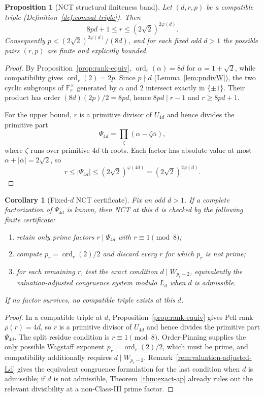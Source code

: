 \documentclass[11pt]{amsart}
\theoremstyle{plain}
\newtheorem{proposition}[theorem]{Proposition}
\newtheorem{corollary}[theorem]{Corollary}
\theoremstyle{definition}
\theoremstyle{remark}
\numberwithin{equation}{section}
\newcommand{\ord}{\operatorname{ord}}
\newcommand{\F}{\mathbb{F}}
\begin{document}
\begin{proposition}[NCT structural finiteness band]\label{prop:nct-band}
Let $(d, r, p)$ be a compatible triple (Definition~\ref{def:compat-triple}). Then
\[
  8 p d + 1 \leq r \leq (2\sqrt 2)^{2\varphi(d)}.
\]
Consequently $p < (2\sqrt 2)^{2\varphi(d)}/(8d)$, and for each fixed odd $d>1$ the possible pairs $(r,p)$ are finite and explicitly bounded.
\end{proposition}

\begin{proof}
By Proposition~\ref{prop:rank-equiv}, $\ord_r(\alpha)=8d$ for $\alpha=1+\sqrt2$, while compatibility gives $\ord_r(2)=2p$. Since $p\nmid d$ (Lemma~\ref{lem:pndivW}), the two cyclic subgroups of $\F_r^\times$ generated by $\alpha$ and $2$ intersect exactly in $\{\pm1\}$. Their product has order $(8d)(2p)/2=8pd$, hence $8pd\mid r-1$ and $r\geq 8pd+1$.

For the upper bound, $r$ is a primitive divisor of $U_{4d}$ and hence divides the primitive part
\[
  \Psi_{4d}=\prod_{\zeta}(\alpha-\zeta\bar\alpha),
\]
where $\zeta$ runs over primitive $4d$-th roots. Each factor has absolute value at most $\alpha+|\bar\alpha|=2\sqrt2$, so
\[
  r\leq |\Psi_{4d}|\leq (2\sqrt2)^{\varphi(4d)}=(2\sqrt2)^{2\varphi(d)}.
\]
\end{proof}

\begin{corollary}[Fixed-$d$ NCT certificate]\label{cor:nct-fixed-d-certificate}
Fix an odd $d>1$. If a complete factorization of $\Psi_{4d}$ is known, then NCT at this $d$ is checked by the following finite certificate:
\begin{enumerate}
\item retain only prime factors $r\mid\Psi_{4d}$ with $r\equiv1\pmod8$;
\item compute $p_r=\ord_r(2)/2$ and discard every $r$ for which $p_r$ is not prime;
\item for each remaining $r$, test the exact condition $d\mid W_{p_r-2}$, equivalently the valuation-adjusted congruence system modulo $L_d$ when $d$ is admissible.
\end{enumerate}
If no factor survives, no compatible triple exists at this $d$.
\end{corollary}

\begin{proof}
In a compatible triple at $d$, Proposition~\ref{prop:rank-equiv} gives Pell rank $\rho(r)=4d$, so $r$ is a primitive divisor of $U_{4d}$ and hence divides the primitive part $\Psi_{4d}$. The split residue condition is $r\equiv1\pmod8$. Order-Pinning supplies the only possible Wagstaff exponent $p_r=\ord_r(2)/2$, which must be prime, and compatibility additionally requires $d\mid W_{p_r-2}$. Remark~\ref{rem:valuation-adjusted-Ld} gives the equivalent congruence formulation for the last condition when $d$ is admissible; if $d$ is not admissible, Theorem~\ref{thm:exact-ap} already rules out the relevant divisibility at a non-Class-III prime factor.
\end{proof}
\end{document}
